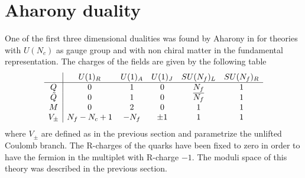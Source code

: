 \section{Aharony duality }
One of the first three dimensional dualities was found by Aharony in \cite{Aharony:1997gp} for theories with $U(N_c) $ as gauge group and with non chiral matter in the fundamental representation.
The charges of the fields are given by the following table
\begin{equation}
\begin{array}{ c | c c c c c}
  & U(1)_R & U(1)_A & U(1)_J  & SU(N_f)_L & SU(N_f)_R \\
 \hline
 Q & 0 & 1& 0 & N_f& 1 \\ 
 \tilde{Q} & 0  & 1&0 & \overline{N_f}&1  \\  
   M & 0 & 2 & 0 & 1 & 1 \\ 
  V_{\pm} & N_f - N_c + 1 & - N_f  & \pm 1 &  1 & 1 \\
\end{array}
\end{equation}
where $V_{\pm} $ are defined as in the previous section and parametrize the unlifted Coulomb branch.
The R-charges of the quarks have been fixed to zero in order to have the fermion in the multiplet with R-charge $-1$.
The moduli space of this theory was described in the previous section.

